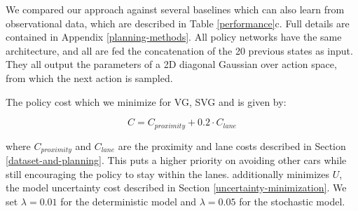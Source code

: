 \documentclass{article} %
\begin{document}
    We compared our approach against several baselines which can also learn from observational data, which are described in Table \ref{performance}c. Full details are contained in Appendix \ref{planning-methods}.
    All policy networks have the same architecture, and all are fed the concatenation of the 20 previous states as input. They all output the parameters of a 2D diagonal Gaussian over action space, from which the next action is sampled.






    The policy cost which we minimize for VG, SVG and \modelnamedrop is given by:

    \begin{equation}
      C = C_{proximity} + 0.2 \cdot C_{lane}
    \end{equation}

    where $C_{proximity}$ and $C_{lane}$ are the proximity and lane costs described in Section \ref{dataset-and-planning}. This puts a higher priority on avoiding other cars while still encouraging the policy to stay within the lanes. \modelnamedrop additionally minimizes $U$, the model uncertainty cost described in Section \ref{uncertainty-minimization}. We set $\lambda=0.01$ for the deterministic model and $\lambda=0.05$ for the stochastic model.
\end{document}

